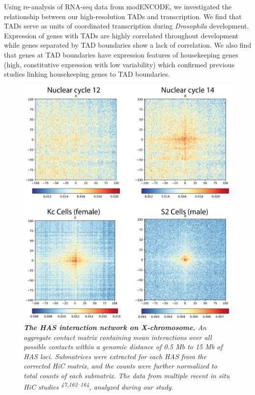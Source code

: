 \documentclass[11pt,twoside]{MPIthesis}
\theoremstyle{definition}
\theoremstyle{definition}
\theoremstyle{definition}
\theoremstyle{remark}
\begin{document}
Using re-analysis of RNA-seq data from modENCODE, we investigated the
relationship between our high-resolution TADs and transcription. We find
that TADs serve as units of coordinated transcription during
\emph{Drosophila} development. Expression of genes with TADs are highly
correlated throughout development while genes separated by TAD
boundaries show a lack of correlation. We also find that genes at TAD
boundaries have expression features of housekeeping genes (high,
constitutive expression with low variability) which confirmed previous
studies linking housekeeping genes to TAD boundaries.
\begin{figure}

{\centering \includegraphics[width=0.7\linewidth]{figures/results_fig2} 

}

\caption[The HAS interaction network on X-chromosome]{\emph{\textbf{The HAS interaction network on X-chromosome.}
An aggregate contact matrix containing mean interactions over all
possible contacts within a genomic distance of 0.5 Mb to 15 Mb of HAS
loci. Submatrices were extracted for each HAS from the corrected HiC
matrix, and the counts were further normalized to total counts of each
submatrix. The data from multiple recent in situ HiC studies
\textsuperscript{47,162--164}, analyzed during our study.}}\label{fig:unnamed-chunk-7}
\end{figure}
\end{document}
